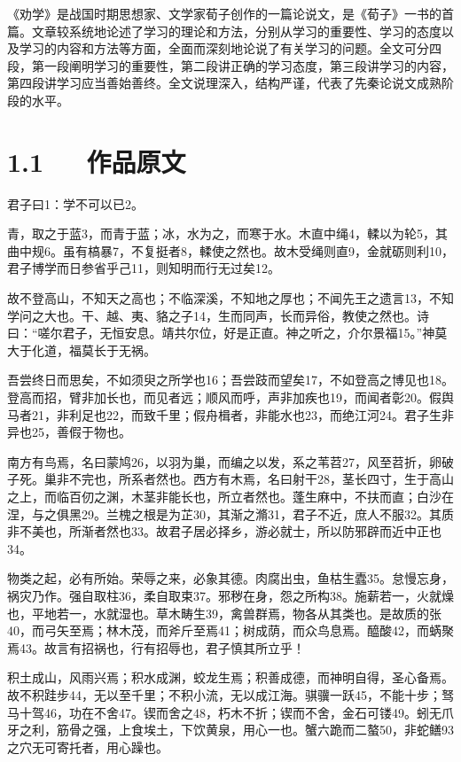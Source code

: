 \documentclass[letterpaper,10pt,english]{sphinxmanual}
\begin{document}
《劝学》是战国时期思想家、文学家荀子创作的一篇论说文，是《荀子》一书的首篇。文章较系统地论述了学习的理论和方法，分别从学习的重要性、学习的态度以及学习的内容和方法等方面，全面而深刻地论说了有关学习的问题。全文可分四段，第一段阐明学习的重要性，第二段讲正确的学习态度，第三段讲学习的内容，第四段讲学习应当善始善终。全文说理深入，结构严谨，代表了先秦论说文成熟阶段的水平。


\section{1.1   作品原文}
\label{\detokenize{p01_u6563_u6587/_u8340_u5b50-_u529d_u5b66:id3}}
君子曰1：学不可以已2。

青，取之于蓝3，而青于蓝；冰，水为之，而寒于水。木直中绳4，輮以为轮5，其曲中规6。虽有槁暴7，不复挺者8，輮使之然也。故木受绳则直9，金就砺则利10，君子博学而日参省乎己11，则知明而行无过矣12。

故不登高山，不知天之高也；不临深溪，不知地之厚也；不闻先王之遗言13，不知学问之大也。干、越、夷、貉之子14，生而同声，长而异俗，教使之然也。诗曰：“嗟尔君子，无恒安息。靖共尔位，好是正直。神之听之，介尔景福15。”神莫大于化道，福莫长于无祸。

吾尝终日而思矣，不如须臾之所学也16；吾尝跂而望矣17，不如登高之博见也18。登高而招，臂非加长也，而见者远；顺风而呼，声非加疾也19，而闻者彰20。假舆马者21，非利足也22，而致千里；假舟楫者，非能水也23，而绝江河24。君子生非异也25，善假于物也。

南方有鸟焉，名曰蒙鸠26，以羽为巢，而编之以发，系之苇苕27，风至苕折，卵破子死。巢非不完也，所系者然也。西方有木焉，名曰射干28，茎长四寸，生于高山之上，而临百仞之渊，木茎非能长也，所立者然也。蓬生麻中，不扶而直；白沙在涅，与之俱黑29。兰槐之根是为芷30，其渐之滫31，君子不近，庶人不服32。其质非不美也，所渐者然也33。故君子居必择乡，游必就士，所以防邪辟而近中正也34。

物类之起，必有所始。荣辱之来，必象其德。肉腐出虫，鱼枯生蠹35。怠慢忘身，祸灾乃作。强自取柱36，柔自取束37。邪秽在身，怨之所构38。施薪若一，火就燥也，平地若一，水就湿也。草木畴生39，禽兽群焉，物各从其类也。是故质的张40，而弓矢至焉；林木茂，而斧斤至焉41；树成荫，而众鸟息焉。醯酸42，而蜹聚焉43。故言有招祸也，行有招辱也，君子慎其所立乎！

积土成山，风雨兴焉；积水成渊，蛟龙生焉；积善成德，而神明自得，圣心备焉。故不积跬步44，无以至千里；不积小流，无以成江海。骐骥一跃45，不能十步；驽马十驾46，功在不舍47。锲而舍之48，朽木不折；锲而不舍，金石可镂49。蚓无爪牙之利，筋骨之强，上食埃土，下饮黄泉，用心一也。蟹六跪而二螯50，非蛇鳝93之穴无可寄托者，用心躁也。
\end{document}
